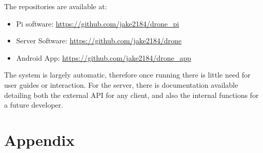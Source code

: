 \documentclass{article}
\begin{document}
The repositories are available at: 
\begin{itemize}
	\item Pi software: \url{https://github.com/jake2184/drone_pi}
	\item Server Software: \url{https://github.com/jake2184/drone}
	\item Android App: \url{https://github.com/jake2184/drone_app}
\end{itemize}

The system is largely automatic, therefore once running there is little need for user guides or interaction. For the server, there is documentation available detailing both the external API for any client, and also the internal functions for a future developer. 




\section{Appendix}
\end{document}
